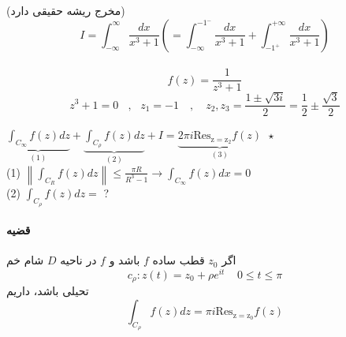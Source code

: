 \example
(مخرج ریشه حقیقی دارد)
\begin{equation*}
I=\int_{-\infty}^{\infty} \frac{d x}{x^{3}+1}\left(=\int_{-\infty}^{-1^-} \frac{d x}{x^{3}+1}+\int_{-1^+}^{+\infty} \frac{d x}{x^{3}+1}\right)
\end{equation*}
\\
\begin{equation*}
f(z)=\frac{1}{z^{3}+1}
\end{equation*}
\begin{equation*}
z^{3}+1=0  \ \ \ \ , \ \ \  z_{1}=-1 \quad,\quad
 z_{2}, z_{3}=\frac{1 \pm \sqrt{3 i}}{2}=\frac{1}{2} \pm \frac{\sqrt{3}}{2}
\end{equation*}

\begin{latin}

$
\underbrace{
\int_{C_{\infty}} f(z) d z}_{(1)}
+
\underbrace{\int_{C_{\rho}} f(z) d z}_{(2)}
+I=
\underbrace{2 \pi i \operatorname{Res_{z=z_2}} f(z)}_{(3)}
 \ \ \star$
\\
(1) \quad $\left\|\int_{C_{R}} f(z) d z\right\| \leqslant \frac{\pi R}{R^{3}-1} \rightarrow \int_{C_{\infty}} f(z) d x=0$
\\
(2) \quad $\int_{C_{\rho}} f(z) d z=$ ?

\end{latin}

\paragraph{قضیه}
اگر 
$z_0$
قطب ساده‌ 
$f$
باشد و 
$f$
در ناحیه‌
$D$
شام خم
$$c_{\rho} : z(t) = z_{0} + \rho e^{it}    \ \ \  \ \ 0\leq t \leq \pi$$
تحیلی باشد، داریم 
$$\int_{C_{\rho}} f(z) d z= \pi i \operatorname{Res_{z=z_0}} f(z)$$

